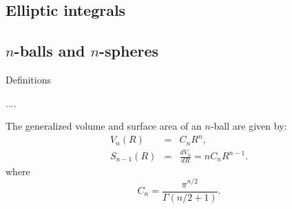 \subsection{Elliptic integrals}



\subsection{$n$-balls and $n$-spheres}

Definitions

....


The generalized volume and surface area of an $n$-ball are given by:
\begin{eqnarray}
V_n(R) & = & C_n R^n,
 \label{eq:gen_vol} \\
S_{n-1}(R) & = & \frac{dV_n}{dR} = n C_n R^{n-1}.
 \label{eq:gen_surf}
\end{eqnarray}
where
\begin{equation}
 \label{eq:cn}
  C_n = \frac{ \pi^{n/2} }{\Gamma(n/2 + 1)}.
\end{equation}



